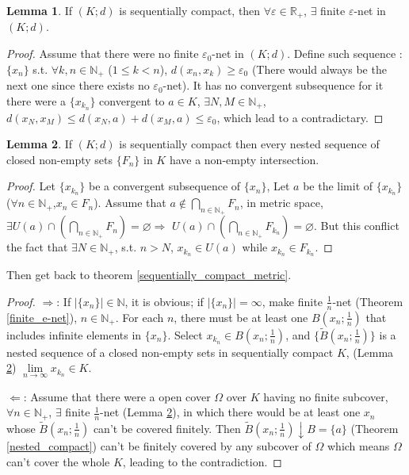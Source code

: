 \documentclass{article}
\theoremstyle{plain}
\theoremstyle{definition}
\newtheorem{lmm}{Lemma} %
\begin{document}
\begin{lmm}\label{sequentially_compact_finite_e-net}
	If $(K;d)$ is sequentially compact, then $\forall \varepsilon\in\mathbb{R}_+$, $\exists$ finite $\varepsilon$-net in $(K;d)$. 
\end{lmm}
\begin{proof}
	Assume that there were no finite  $\varepsilon_0$-net in $(K;d)$. Define such sequence : $ \{x_n\}$ s.t. $\forall k,n\in\mathbb{N}_+$ ($1\leq k< n$), $d(x_n,x_k)\geq\varepsilon_0$ (There would always be the next one since there exists no $\varepsilon_0$-net). It has no convergent subsequence for it there were a $\{x_{k_n}\}$ convergent to $a\in K$, $\exists N,M\in\mathbb{N}_+$, $d(x_N,x_M)\leq d(x_N,a)+d(x_M,a)\leq \varepsilon_0$, which lead to a contradictary. 
\end{proof}
\begin{lmm}\label{sequentially_compact_nested_closed}
If $(K;d)$ is sequentially compact then every nested sequence of closed non-empty sets $\{F_n\}$ in $K$ have a non-empty intersection.
\end{lmm}
\begin{proof}
	Let $\{x_{k_n}\}$ be a convergent subsequence of $\{x_n\}$, Let $a$ be the limit of $\{x_{k_n}\}$ ($\forall n\in\mathbb{N}_+$,$x_n\in F_n$). Assume that $a\notin \bigcap_{n\in\mathbb{N}_+}F_n$, in metric space, $\exists U(a)\cap \left(\bigcap_{n\in\mathbb{N}_+}F_n\right)=\varnothing\Rightarrow $ $U(a)\cap \left(\bigcap_{n\in\mathbb{N}_+}F_{k_n}\right)=\varnothing$. But this conflict the fact that $\exists N\in\mathbb{N}_+$, s.t. $n>N$, $x_{k_n}\in U(a)$ while $x_{k_n}\in F_{k_n}$.
\end{proof}
Then get back to theorem \ref{sequentially_compact_metric}. 
\begin{proof}

	$\Rightarrow$: If $\left|\{x_n\}\right|\in\mathbb{N}$, it is obvious; if $\left|\{x_n\}\right|=\infty$, make finite $\frac{1}{n}$-net (Theorem \ref{finite_e-net}), $n\in\mathbb{N}_+$. For each $n$, there must be at least one $B(x_n;\frac{1}{n})$ that includes infinite elements in $\{x_n\}$. Select $x_{k_n}\in B(x_n;\frac{1}{n})$, and $\{\tilde{B}(x_n;\frac{1}{n})\}$ is a nested sequence of a closed non-empty sets in sequentially compact $K$, (Lemma \ref{sequentially_compact_nested_closed}) $\lim\limits_{n\to \infty} x_{k_n} \in K$.
	
	$\Leftarrow$: Assume that there were a open cover $\Omega$ over $K$ having no finite subcover, $\forall n\in\mathbb{N}_+$, $\exists$ finite $\frac{1}{n}$-net (Lemma \ref{sequentially_compact_nested_closed}), in which there would be at least one $x_n$ whose $\tilde{B}(x_n;\frac{1}{n})$ can't be covered finitely. Then $\tilde{B}(x_n;\frac{1}{n})\downarrow B=\{a\}$ (Theorem \ref{nested_compact}) can't be finitely covered by any subcover of $\Omega$ which means $\Omega$ can't cover the whole $K$, leading to the contradiction.
\end{proof}
\end{document}
